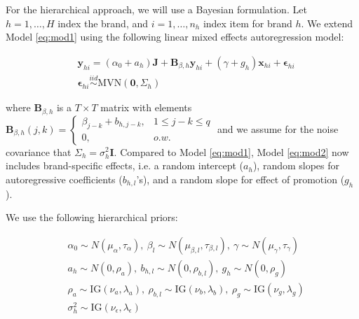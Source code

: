 \documentclass{article}
\begin{document}
\noindent For the hierarchical approach, we will use a Bayesian formulation. Let $h=1,\ldots,H$ index the brand, and $i=1,\ldots,n_h$ index item for brand $h$. We extend Model \ref{eq:mod1} using the following linear mixed effects autoregression model:

\begin{align}
    & \mathbf{y}_{hi} = (\alpha_0+a_h)\mathbf{J}+\mathbf{B}_{\beta,h}\mathbf{y}_{hi}+(\gamma+g_h) \mathbf{x}_{hi}+\boldsymbol{\epsilon}_{hi} \label{eq:mod2} \\
    & \boldsymbol{\epsilon}_{hi} \overset{iid}{\sim} \text{MVN}(\boldsymbol{0}, \Sigma_h)
\end{align}

\noindent where $\mathbf{B}_{\beta,h}$ is a $T\times T$ matrix with elements $\mathbf{B}_{\beta,h}(j,k)=\begin{cases} \beta_{j-k}+b_{h,j-k}, & 1 \leq j-k\leq q \\
0, & o.w.
\end{cases}$ and we assume for the noise covariance that $\Sigma_h=\sigma_h^2 \mathbf{I}$. Compared to Model \ref{eq:mod1}, Model \ref{eq:mod2} now includes brand-specific effects, i.e. a random intercept ($a_h$), random slopes for autoregressive coefficients ($b_{h,l}$'s), and a random slope for effect of promotion ($g_h$).


\noindent We use the following hierarchical priors:

\begin{align*}
    & \alpha_0 \sim N(\mu_{\alpha},\tau_{\alpha}), \ \beta_l \sim N(\mu_{\beta,l}, \tau_{\beta,l}), \ \gamma \sim N(\mu_{\gamma}, \tau_{\gamma}) \\
    & a_h \sim N(0, \rho_a), \ b_{h,l} \sim N(0, \rho_{b,l}), \ g_h \sim N(0,\rho_g) \\
    & \rho_a \sim \text{IG}(\nu_{a}, \lambda_{a}), \ \rho_{b,l} \sim \text{IG}(\nu_{b}, \lambda_{b}), \ \rho_g \sim \text{IG}(\nu_{g}, \lambda_{g}) \\
    & \sigma_h^2 \sim \text{IG}(\nu_{\epsilon}, \lambda_{\epsilon})
\end{align*}
\end{document}
